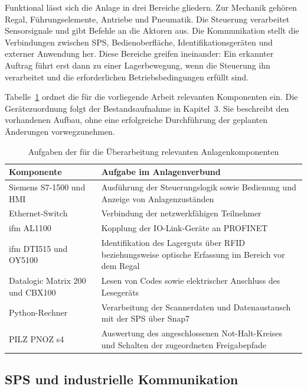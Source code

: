 Funktional lässt sich die Anlage in drei Bereiche gliedern. Zur Mechanik gehören Regal, Führungselemente, Antriebe und Pneumatik. Die Steuerung verarbeitet Sensorsignale und gibt Befehle an die Aktoren aus. Die Kommunikation stellt die Verbindungen zwischen SPS, Bedienoberfläche, Identifikationsgeräten und externer Anwendung her. Diese Bereiche greifen ineinander: Ein erkannter Auftrag führt erst dann zu einer Lagerbewegung, wenn die Steuerung ihn verarbeitet und die erforderlichen Betriebsbedingungen erfüllt sind.

Tabelle~\ref{tab:grundlagen_komponenten} ordnet die für die vorliegende Arbeit relevanten Komponenten ein. Die Gerätezuordnung folgt der Bestandsaufnahme in Kapitel~3. Sie beschreibt den vorhandenen Aufbau, ohne eine erfolgreiche Durchführung der geplanten Änderungen vorwegzunehmen.

\begin{table}[htbp]
  \centering
  \caption{Aufgaben der für die Überarbeitung relevanten Anlagenkomponenten}
  \label{tab:grundlagen_komponenten}
  \small
  \begin{tabular}{|p{}|p{}|}
    \hline
    \textbf{Komponente} & \textbf{Aufgabe im Anlagenverbund} \\ \hline
    Siemens S7-1500 und HMI & Ausführung der Steuerungslogik sowie Bedienung und Anzeige von Anlagenzuständen \\ \hline
    Ethernet-Switch & Verbindung der netzwerkfähigen Teilnehmer \\ \hline
    ifm AL1100 & Kopplung der IO-Link-Geräte an PROFINET \\ \hline
    ifm DTI515 und OY5100 & Identifikation des Lagerguts über RFID beziehungsweise optische Erfassung im Bereich vor dem Regal \\ \hline
    Datalogic Matrix 200 und CBX100 & Lesen von Codes sowie elektrischer Anschluss des Lesegeräts \\ \hline
    Python-Rechner & Verarbeitung der Scannerdaten und Datenaustausch mit der SPS über Snap7 \\ \hline
    PILZ PNOZ s4 & Auswertung des angeschlossenen Not-Halt-Kreises und Schalten der zugeordneten Freigabepfade \\ \hline
  \end{tabular}
\end{table}

\subsection{SPS und industrielle Kommunikation}
\label{sec:grundlagen_sps}

